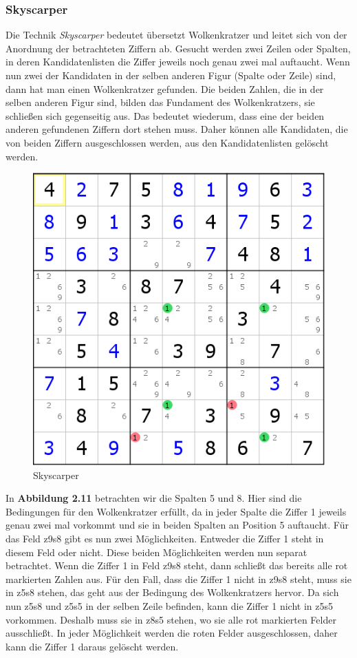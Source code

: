 \newpage
\subsubsection{Skyscarper}
\label{Skyscarper}
Die Technik \textit{Skyscarper} bedeutet übersetzt Wolkenkratzer und leitet sich von der Anordnung der betrachteten Ziffern ab. Gesucht werden zwei Zeilen oder Spalten, in deren Kandidatenlisten die Ziffer jeweils noch genau zwei mal auftaucht. Wenn nun zwei der Kandidaten in der selben anderen Figur (Spalte oder Zeile) sind, dann hat man einen Wolkenkratzer gefunden. Die beiden Zahlen, die in der selben anderen Figur sind, bilden das Fundament des Wolkenkratzers, sie schließen sich gegenseitig aus. Das bedeutet wiederum, dass eine der beiden anderen gefundenen Ziffern dort stehen muss. Daher können alle Kandidaten, die von beiden Ziffern ausgeschlossen werden, aus den Kandidatenlisten gelöscht werden.	

\begin{figure}[h]
\begin{center}
\includegraphics{./img/skyscarper.png}
\caption{Skyscarper}
\end{center}
\end{figure}

\noindent In \textbf{Abbildung 2.11} betrachten wir die Spalten 5 und 8. Hier sind die Bedingungen für den Wolkenkratzer erfüllt, da in jeder Spalte die Ziffer 1 jeweils genau zwei mal vorkommt und sie in beiden Spalten an Position 5 auftaucht. Für das Feld z9s8 gibt es nun zwei Möglichkeiten. Entweder die Ziffer 1 steht in diesem Feld oder nicht. Diese beiden Möglichkeiten werden nun separat betrachtet. Wenn die Ziffer 1 in Feld z9s8 steht, dann schließt das bereits alle rot markierten Zahlen aus. Für den Fall, dass die Ziffer 1 nicht in z9s8 steht, muss sie in z5s8 stehen, das geht aus der Bedingung des Wolkenkratzers hervor. Da sich nun z5s8 und z5s5 in der selben Zeile befinden, kann die Ziffer 1 nicht in z5s5 vorkommen. Deshalb muss sie in z8s5 stehen, wo sie alle rot markierten Felder ausschließt. In jeder Möglichkeit werden die roten Felder ausgeschlossen, daher kann die Ziffer 1 daraus gelöscht werden.